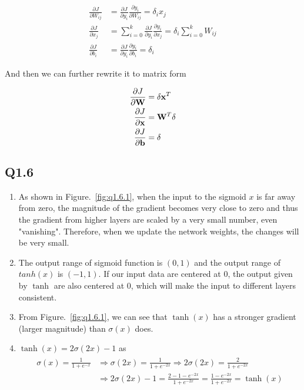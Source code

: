 \documentclass[11pt]{article}
\begin{document}
\begin{align}
  \frac{\partial J}{\partial W_{ij}} &= \frac{\partial J}{\partial y_i} \frac{\partial y_i}{\partial W_{ij}} = \delta_i x_j \\
  \frac{\partial J}{\partial x_j} &= \sum_{i=0}^k \frac{\partial J}{\partial y_i}\frac{\partial y_i}{\partial x_j} = \delta_i \sum_{i=0}^k W_{ij} \\
  \frac{\partial J}{\partial b_i} &= \frac{\partial J}{\partial y_i} \frac{\partial y_i}{\partial b_i} = \delta_i
\end{align}

And then we can further rewrite it to matrix form

\begin{align}
  \frac{\partial J}{\partial\mathbf{W}} &= \mathbf{\delta} \mathbf{x}^T \\
  \frac{\partial J}{\partial\mathbf{x}} &= \mathbf{W}^T \mathbf{\delta} \\
  \frac{\partial J}{\partial\mathbf{b}} &= \mathbf{\delta}
\end{align}

\newpage

\subsection*{Q1.6}

\begin{enumerate}
    \item As shown in Figure.~\ref{fig:q1.6.1}, when the input to the sigmoid $x$ is far away from zero, the magnitude of the gradient becomes very close to zero and thus the gradient from higher layers are scaled by a very small number, even "vanishing". Therefore, when we update the network weights, the changes will be very small.
    \item The output range of sigmoid function is $(0,1)$ and the output range of $tanh(x)$ is $(-1,1)$. If our input data are centered at 0, the output given by $\tanh$ are also centered at 0, which will make the input to different layers consistent.
    \item From Figure.~\ref{fig:q1.6.1}, we can see that $\tanh(x)$ has a stronger gradient (larger magnitude) than $\sigma(x)$ does.
    \item $\tanh(x)=2\sigma(2x)-1$ as
    \begin{align}
    \begin{split}
        \sigma(x) = \frac{1}{1+e^{-x}}
        &\Rightarrow \sigma(2x) = \frac{1}{1+e^{-2x}}
        \Rightarrow 2\sigma(2x) = \frac{2}{1+e^{-2x}} \\
        &\Rightarrow 2\sigma(2x)-1 = \frac{2-1-e^{-2x}}{1+e^{-2x}} = \frac{1-e^{-2x}}{1+e^{-2x}} = \tanh(x)
    \end{split}
    \end{align}
\end{enumerate}
\end{document}
